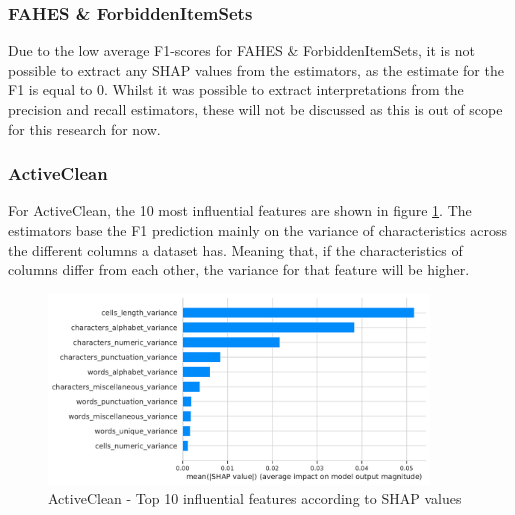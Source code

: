 \subsubsection{FAHES \& ForbiddenItemSets}
Due to the low average F1-scores for FAHES \& ForbiddenItemSets, it is not possible to extract any SHAP values from the estimators, as the estimate for the F1 is equal to 0. Whilst it was possible to extract interpretations from the precision and recall estimators, these will not be discussed as this is out of scope for this research for now.

\subsubsection{ActiveClean}
For ActiveClean, the 10 most influential features are shown in figure \ref{fig:most_impact_features_activeclean}. The estimators base the F1 prediction mainly on the variance of characteristics across the different columns a dataset has. Meaning that, if the characteristics of columns differ from each other, the variance for that feature will be higher.

\begin{figure}[H]
    \centering
    \includegraphics[width=0.9\textwidth]{thesis/Figures/RQ4/Shap_ActiveClean.pdf}
    \caption{ActiveClean - Top 10 influential features according to SHAP values}
    \label{fig:most_impact_features_activeclean}
\end{figure}

